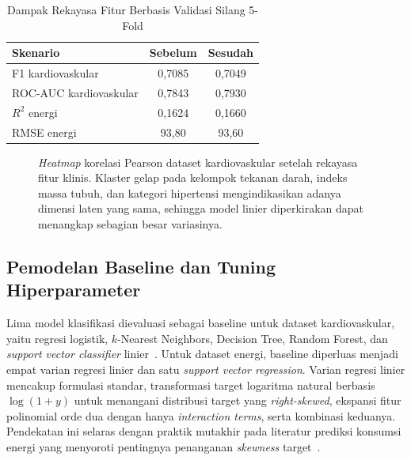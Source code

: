 \documentclass[conference]{IEEEtran}
\begin{document}
\begin{table}[t]
\caption{Dampak Rekayasa Fitur Berbasis Validasi Silang 5-Fold}
\label{tab:fe}
\centering
\renewcommand{\arraystretch}{1.15}
\setlength{\tabcolsep}{4pt}
\begin{tabular}{lcc}
\toprule
\textbf{Skenario} & \textbf{Sebelum} & \textbf{Sesudah} \\
\midrule
F1 kardiovaskular        & 0{,}7085 & 0{,}7049 \\
ROC-AUC kardiovaskular   & 0{,}7843 & 0{,}7930 \\
$R^2$ energi             & 0{,}1624 & 0{,}1660 \\
RMSE energi              & 93{,}80  & 93{,}60  \\
\bottomrule
\end{tabular}
\end{table}

\begin{figure}[t]
\centering

\caption{\textit{Heatmap} korelasi Pearson dataset kardiovaskular setelah rekayasa fitur klinis. Klaster gelap pada kelompok tekanan darah, indeks massa tubuh, dan kategori hipertensi mengindikasikan adanya dimensi laten yang sama, sehingga model linier diperkirakan dapat menangkap sebagian besar variasinya.}
\label{fig:heatmap_cardio}
\end{figure}

\subsection{Pemodelan Baseline dan Tuning Hiperparameter}
Lima model klasifikasi dievaluasi sebagai baseline untuk dataset kardiovaskular, yaitu regresi logistik, $k$-Nearest Neighbors, Decision Tree, Random Forest, dan \textit{support vector classifier} linier~\cite{Pedregosa2011,Hastie2009}. Untuk dataset energi, baseline diperluas menjadi empat varian regresi linier dan satu \textit{support vector regression}. Varian regresi linier mencakup formulasi standar, transformasi target logaritma natural berbasis $\log(1+y)$ untuk menangani distribusi target yang \textit{right-skewed}, ekspansi fitur polinomial orde dua dengan hanya \textit{interaction terms}, serta kombinasi keduanya. Pendekatan ini selaras dengan praktik mutakhir pada literatur prediksi konsumsi energi yang menyoroti pentingnya penanganan \textit{skewness} target~\cite{Tien2022,Bourdeau2019}.
\end{document}
